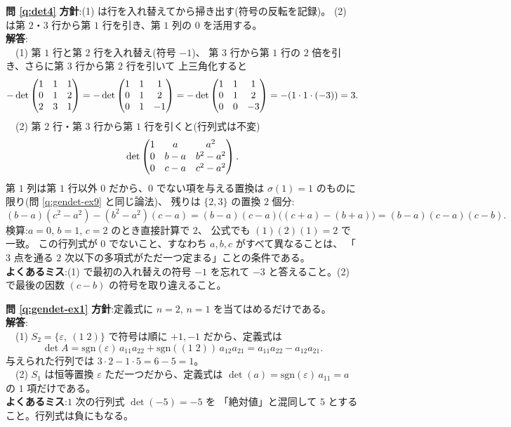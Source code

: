 \bigskip
\noindent\textbf{問 \ref{q:det4}}\quad
\textbf{方針}:(1) は行を入れ替えてから掃き出す(符号の反転を記録)。
(2) は第 $2$・$3$ 行から第 $1$ 行を引き、第 $1$ 列の $0$ を活用する。\\
\textbf{解答}:\\
　(1) 第 $1$ 行と第 $2$ 行を入れ替え(符号 $-1$)、
第 $3$ 行から第 $1$ 行の $2$ 倍を引き、さらに第 $3$ 行から第 $2$ 行を引いて
上三角化すると
\[
-\det \begin{pmatrix}1 & 1 & 1 \\ 0 & 1 & 2 \\ 2 & 3 & 1\end{pmatrix}
= -\det \begin{pmatrix}1 & 1 & 1 \\ 0 & 1 & 2 \\ 0 & 1 & -1\end{pmatrix}
= -\det \begin{pmatrix}1 & 1 & 1 \\ 0 & 1 & 2 \\ 0 & 0 & -3\end{pmatrix}
= -(1 \cdot 1 \cdot (-3)) = 3.
\]
　(2) 第 $2$ 行・第 $3$ 行から第 $1$ 行を引くと(行列式は不変)
\[
\det \begin{pmatrix}1 & a & a^2 \\ 0 & b - a & b^2 - a^2 \\ 0 & c - a & c^2 - a^2\end{pmatrix}.
\]
第 $1$ 列は第 $1$ 行以外 $0$ だから、$0$ でない項を与える置換は
$\sigma(1) = 1$ のものに限り(問 \ref{q:gendet-ex9} と同じ論法)、
残りは $\{2, 3\}$ の置換 $2$ 個分:
\[
(b - a)(c^2 - a^2) - (b^2 - a^2)(c - a)
= (b - a)(c - a)\bigl((c + a) - (b + a)\bigr)
= (b - a)(c - a)(c - b).
\]
検算:$a = 0$, $b = 1$, $c = 2$ のとき直接計算で $2$、
公式でも $(1)(2)(1) = 2$ で一致。
この行列式が $0$ でないこと、すなわち $a, b, c$ がすべて異なることは、
「$3$ 点を通る $2$ 次以下の多項式がただ一つ定まる」ことの条件である。\\
\textbf{よくあるミス}:(1) で最初の入れ替えの符号 $-1$ を忘れて
$-3$ と答えること。(2) で最後の因数 $(c - b)$ の符号を取り違えること。

\bigskip
\noindent\textbf{問 \ref{q:gendet-ex1}}\quad
\textbf{方針}:定義式に $n = 2$, $n = 1$ を当てはめるだけである。\\
\textbf{解答}:\\
　(1) $S_2 = \{\varepsilon,\ (1\;2)\}$ で符号は順に $+1, -1$
だから、定義式は
\[
\det A = \mathrm{sgn}(\varepsilon)\,a_{11}a_{22}
+ \mathrm{sgn}((1\;2))\,a_{12}a_{21} = a_{11}a_{22} - a_{12}a_{21}.
\]
与えられた行列では $3 \cdot 2 - 1 \cdot 5 = 6 - 5 = 1$。\\
　(2) $S_1$ は恒等置換 $\varepsilon$ ただ一つだから、定義式は
$\det(a) = \mathrm{sgn}(\varepsilon)\,a_{11} = a$ の $1$ 項だけである。\\
\textbf{よくあるミス}:$1$ 次の行列式 $\det(-5) = -5$ を
「絶対値」と混同して $5$ とすること。行列式は負にもなる。

